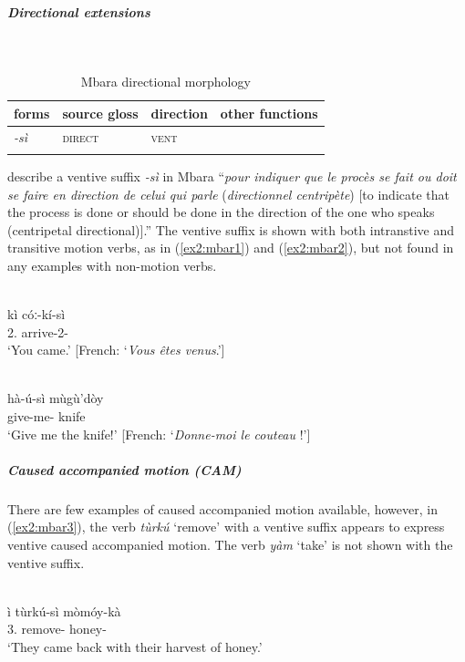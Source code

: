\subparagraph{Directional extensions}~


\begin{table}[H]
	\caption{Mbara directional morphology}
	\label{tab:mbar}
	\begin{tabular}{llll} %
		\lsptoprule
		forms & source gloss & direction  & other functions  \\ %
		\midrule
		\textit{-sì}  &  \textsc{direct}  &  \textsc{vent} &     \\
		\lspbottomrule
	\end{tabular}
\end{table} 

\citet[189]{tourneuxMbaraLeurLangue1986} describe a ventive suffix \textit{-sì} in Mbara ``\textit{pour indiquer que le procès se fait ou doit se faire en direction de celui qui parle} (\textit{directionnel centripète}) [to indicate that the process is done or should be done in the direction of the one who speaks (centripetal directional)].'' The ventive suffix is shown with both intranstive and transitive motion verbs, as in (\ref{ex2:mbar1}) and (\ref{ex2:mbar2}), but not found in any examples with non-motion verbs. 

\ea\label{ex2:mbar1}
 \\
\gll kì cóː-kí-sì \\
2. arrive-2- \\
\glt `You came.' [French: `\textit{Vous êtes venus}.']

\ex\label{ex2:mbar2}
 \\
\gll hà-ú-sì mùgù'dòy \\
give-me- knife \\
\glt `Give me the knife!' [French: `\textit{Donne-moi le couteau} !']
\z 

\subparagraph{Caused accompanied motion (CAM)}

There are few examples of caused accompanied motion available, however, in (\ref{ex2:mbar3}), the verb \textit{tùrkú} `remove' with a ventive suffix appears to express ventive caused accompanied motion. The verb \textit{yàm} `take' is not shown with the ventive suffix.

\ea\label{ex2:mbar3}
 \\
\gll ì tùrkú-sì mòmóy-kà	\\
3. remove- honey- \\
\glt `They came back with their harvest of honey.' 
\z 


